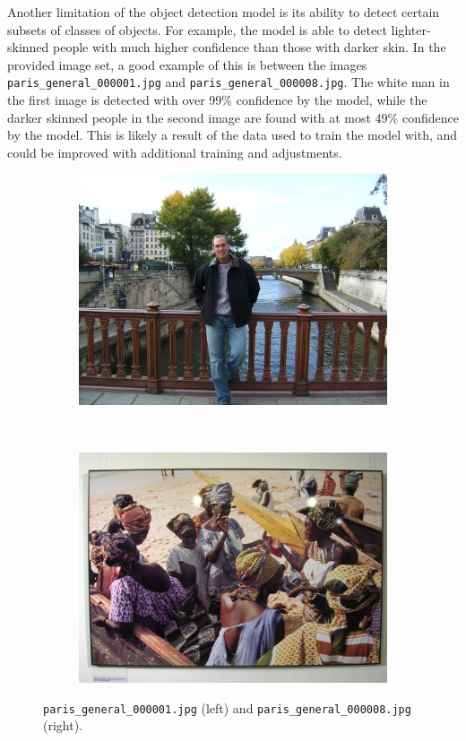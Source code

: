 \documentclass[12pt]{article}
\begin{document}
	Another limitation of the object detection model is its ability to detect certain subsets of classes of objects. For example, the model is able to detect lighter-skinned people with much higher confidence than those with darker skin. In the provided image set, a good example of this is between the images \texttt{paris\_general\_000001.jpg} and \texttt{paris\_general\_000008.jpg}. The white man in the first image is detected with over 99\% confidence by the model, while the darker skinned people in the second image are found with at most 49\% confidence by the model. This is likely a result of the data used to train the model with, and could be improved with additional training and adjustments.
	
	\begin{figure}[H]
		\centering
		\begin{subfigure}[b]{.5\textwidth}
			\includegraphics[width=1\textwidth]{images/paris_general_000001.jpg}
		\end{subfigure}%
		~
		\begin{subfigure}[b]{.5\textwidth}
			\includegraphics[width=1\textwidth]{images/paris_general_000008.jpg}
		\end{subfigure}
		
		\caption{\texttt{paris\_general\_000001.jpg} (left) and \texttt{paris\_general\_000008.jpg} (right).}
		\label{fig:poor_subset_detection}
	\end{figure}
	
\end{document}
